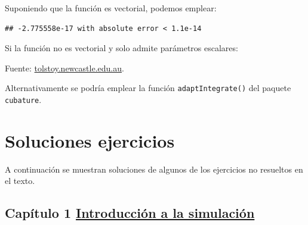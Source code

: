 \documentclass[
]{book}
\newenvironment{Shaded}{\begin{snugshade}}{\end{snugshade}}
\newcommand{\ControlFlowTok}[1]{\textcolor[rgb]{0.13,0.29,0.53}{\textbf{#1}}}
\newcommand{\FunctionTok}[1]{\textcolor[rgb]{0.00,0.00,0.00}{#1}}
\newcommand{\NormalTok}[1]{#1}
\newcommand{\SpecialCharTok}[1]{\textcolor[rgb]{0.00,0.00,0.00}{#1}}
\theoremstyle{break}
\theoremstyle{nonumberplain}
\begin{document}
Suponiendo que la función es vectorial, podemos emplear:

\begin{Shaded}
\end{Shaded}

\begin{verbatim}
## -2.775558e-17 with absolute error < 1.1e-14
\end{verbatim}

Si la función no es vectorial y solo admite parámetros escalares:

\begin{Shaded}
\end{Shaded}

Fuente: \href{http://tolstoy.newcastle.edu.au/R/help/04/10/5951.html}{tolstoy.newcastle.edu.au}.

Alternativamente se podría emplear la función \texttt{adaptIntegrate()} del paquete \texttt{cubature}.

\hypertarget{soluciones}{%
\chapter{Soluciones ejercicios}\label{soluciones}}

A continuación se muestran soluciones de algunos de los ejercicios no resueltos en el texto.

\hypertarget{capuxedtulo-1-introducciuxf3n-a-la-simulaciuxf3n}{%
\section{\texorpdfstring{Capítulo 1 \href{intro.html}{Introducción a la simulación}}{Capítulo 1 Introducción a la simulación}}\label{capuxedtulo-1-introducciuxf3n-a-la-simulaciuxf3n}}
\end{document}
